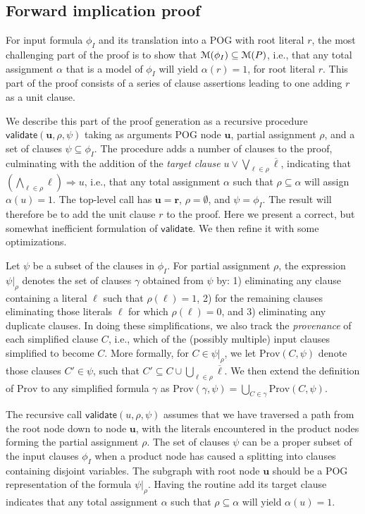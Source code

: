 \documentclass[letterpaper,USenglish,cleveref, autoref, thm-restate]{lipics-v2021}
\newcommand{\obar}[1]{\overline{#1}}
\newcommand{\lit}{\ell}
\newcommand{\imply}{\Rightarrow}
\newcommand{\assign}{\alpha}
\newcommand{\passign}{\rho}
\newcommand{\modelset}{{\cal M}}
\newcommand{\validate}{\textsf{validate}}
\newcommand{\prov}{\textrm{Prov}}
\newcommand{\inputformula}{\phi_I}
\newcommand{\makenode}[1]{\mathbf{#1}}
\newcommand{\nodeu}{\makenode{u}}
\newcommand{\noder}{\makenode{r}}
\newcommand{\simplify}[2]{#1|_{#2}}
\begin{document}
\subsection{Forward implication proof}

For input formula $\inputformula$ and its translation into a POG with root literal
$r$, the most challenging part of the proof is to show that
$\modelset(\inputformula) \subseteq \modelset(P)$, i.e., that any total
assignment $\alpha$ that is a model of $\inputformula$ will yield $\assign(r) =
1$, for root literal $r$.
This part of the proof consists of a series of clause assertions
leading to one adding $r$ as a unit clause.

We describe this part of the proof generation as a recursive procedure
$\validate(\nodeu, \passign, \psi)$ taking as arguments POG
node $\nodeu$, partial assignment
$\passign$, and a set of clauses $\psi \subseteq \inputformula$.
The procedure adds a number of clauses to the proof, culminating with
the addition of the {\em target clause}
$u \lor \bigvee_{\lit \in \passign} \obar{\lit}$, indicating
that $\left(\bigwedge_{\lit \in \passign} \lit\right) \imply u$, i.e.,
that any total
assignment $\assign$ such that $\passign \subseteq \assign$
will assign $\assign(u) = 1$.
The top-level call has $\nodeu = \noder$, $\passign = \emptyset$, and $\psi = \inputformula$.
The result will therefore be to add the unit clause $r$ to the proof.
Here we present a correct, but somewhat inefficient formulation of
$\validate$.  We then refine it with some optimizations.

Let $\psi$ be a subset of the clauses in $\inputformula$.
For partial assignment
$\passign$, the expression  $\simplify{\psi}{\passign}$ denotes the set of clauses $\gamma$
obtained from $\psi$ by: 1) eliminating any
clause containing a literal $\lit$ such that $\passign(\lit) = 1$,
2) for the remaining clauses eliminating those literals $\lit$ for
which $\passign(\lit) = 0$, and 3) eliminating any duplicate clauses.
In doing these simplifications, we also track the {\em provenance}
of each simplified clause $C$, i.e., which of the (possibly multiple) input clauses simplified to become $C$.
More formally, for $C \in \simplify{\psi}{\passign}$, we let $\prov(C, \psi)$ denote
those clauses $C' \in \psi$, such that
$C' \subseteq C \cup \bigcup_{\lit \in \passign} \obar{\lit}$.
We then extend the definition of $\prov$ to any simplified formula
$\gamma$ as $\prov(\gamma, \psi) = \bigcup_{C \in \gamma} \prov(C, \psi)$.

The recursive call $\validate(u, \passign, \psi)$ assumes that we have
traversed a path from the root node down to node $\nodeu$, with the
literals encountered in the product nodes forming the partial
assignment $\passign$.  The set of clauses $\psi$ can be a proper
subset of the input clauses $\inputformula$ when a product node has caused
a splitting into clauses containing disjoint variables.
The subgraph with root node $\nodeu$ should be a POG representation of the formula
$\simplify{\psi}{\passign}$.  Having the
routine add its target clause indicates that any total assignment
$\assign$ such that $\passign \subseteq \assign$ will yield $\alpha(u) = 1$.
\end{document}
